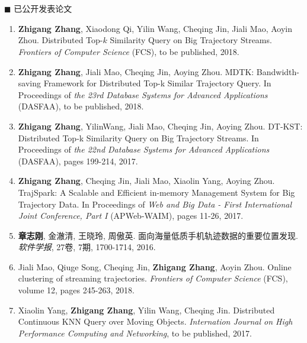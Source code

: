\chapter*{}
{\heiti $\blacksquare$ 已公开发表论文}
	\vskip 5mm

\begin{enumerate}
	\renewcommand{\labelenumi}{[\theenumi]}
	\renewcommand\baselinestretch{1}\selectfont 	
	
	\item  \textbf{Zhigang Zhang}, Xiaodong Qi, Yilin Wang, Cheqing Jin, Jiali Mao, Aoyin Zhou. Distributed Top-$k$ Similarity Query on Big Trajectory Streams. \textit{Frontiers of Computer Science} (FCS), to be published, 2018.
	
	\item \textbf{Zhigang Zhang}, Jiali Mao, Cheqing Jin, Aoying Zhou. MDTK: Bandwidth-saving Framework for Distributed Top-k Similar Trajectory Query. In Proceedings of \textit{the 23rd Database Systems for Advanced Applications} (DASFAA), to be published, 2018.
	
	\item \textbf{Zhigang Zhang}, YilinWang, Jiali Mao, Cheqing Jin, Aoying Zhou. DT-KST: Distributed Top-k Similarity Query on Big
Trajectory Streams. In Proceedings of \textit{the 22nd Database Systems for Advanced Applications} (DASFAA), pages 199-214, 2017.
	
	\item \textbf{Zhigang Zhang}, Cheqing Jin, Jiali Mao, Xiaolin Yang, Aoying Zhou. TrajSpark: A Scalable and Efficient in-memory Management System for Big Trajectory Data. In Proceedings of \textit{Web and Big Data - First International Joint Conference, Part {I}} (APWeb-WAIM), pages 11-26, 2017.
	
	\item \textbf{章志刚}, 金澈清, 王晓玲, 周傲英. 面向海量低质手机轨迹数据的重要位置发现.  \textit{软件学报},
	27卷, 7期, 1700-1714, 2016.
	
		\item  Jiali Mao, Qiuge Song, Cheqing Jin, \textbf{Zhigang Zhang}, Aoyin Zhou. Online clustering of streaming trajectories. \textit{Frontiers of Computer Science} (FCS), volume 12, pages 245-263, 2018.
	
	
	\item  Xiaolin Yang, \textbf{Zhigang Zhang},  Yilin Wang, Cheqing Jin. Distributed Continuous KNN Query over Moving Objects. \textit{Internation Journal on  High Performance Computing and Networking}, to be published, 2017.
	

\end{enumerate}
